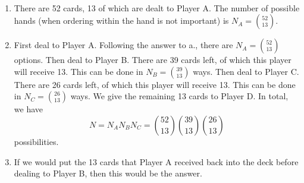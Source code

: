 
\setcounter{theorem}{11}

\begin{exercise}[BH.1.12]
\begin{solution}~
	\begin{enumerate}
		\item There are 52 cards, 13 of which are dealt to Player A. The number of possible hands (when ordering within the hand is not important) is $N_{A}={52 \choose 13}$.
	 	\item First deal to Player A. Following the answer to a., there are $N_{A}={52 \choose 13}$ options. Then deal to Player B. There are 39 cards left, of which this player will receive 13. This can be done in $N_{B} ={39 \choose 13}$ ways. Then deal to Player C. There are 26 cards left, of which this player will receive 13. This can be done in $N_{C}={26\choose 13}$ ways. We give the remaining 13 cards to Player D. In total, we have $$N = N_{A}N_{B}N_{C} = {52 \choose 13}{39 \choose 13}{26 \choose 13}$$ possibilities.
	 	\item If we would put the 13 cards that Player A received back into the deck before dealing to Player B, then this would be the answer.
	\end{enumerate}
\end{solution}
\end{exercise}


